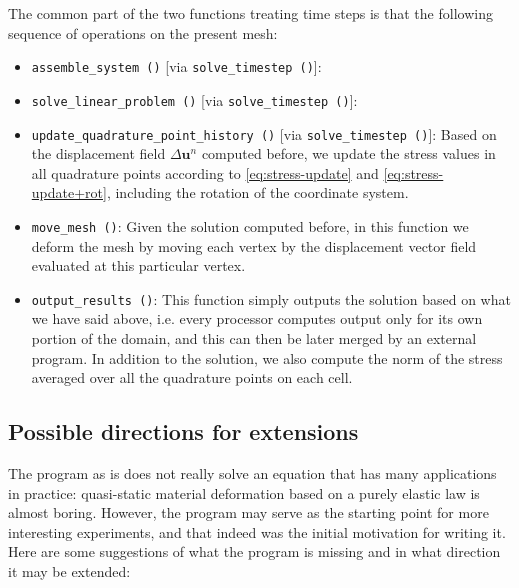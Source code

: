 \documentclass{article}
\renewcommand{\vec}[1]{\mathbf{#1}}
\begin{document}
The common part of the two functions treating time steps is that the following
sequence of operations on the present mesh:
\begin{itemize}
\item \texttt{assemble\_system ()} [via \texttt{solve\_timestep ()}]:
\item \texttt{solve\_linear\_problem ()} [via \texttt{solve\_timestep ()}]: 
\item \texttt{update\_quadrature\_point\_history ()} [via
  \texttt{solve\_timestep ()}]: Based on the displacement field $\Delta \vec
  u^n$ computed before, we update the stress values in all quadrature points
  according to \eqref{eq:stress-update} and \eqref{eq:stress-update+rot},
  including the rotation of the coordinate system.

\item \texttt{move\_mesh ()}: Given the solution computed before, in this
  function we deform the mesh by moving each vertex by the displacement vector
  field evaluated at this particular vertex.

\item \texttt{output\_results ()}: This function simply outputs the solution
  based on what we have said above, i.e. every processor computes output only
  for its own portion of the domain, and this can then be later merged by an
  external program. In addition to the solution, we also compute the norm of
  the stress averaged over all the quadrature points on each cell.
\end{itemize}


\subsection*{Possible directions for extensions}

The program as is does not really solve an equation that has many applications
in practice: quasi-static material deformation based on a purely elastic law
is almost boring. However, the program may serve as the starting point for
more interesting experiments, and that indeed was the initial motivation for
writing it. Here are some suggestions of what the program is missing and in
what direction it may be extended:
\end{document}
